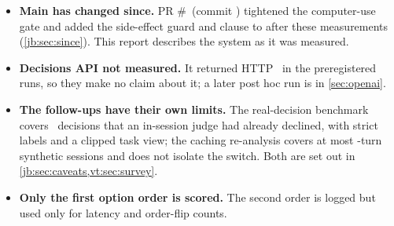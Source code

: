 \begin{itemize}
    from the harness path and are reported as measured.
  \item \textbf{Main has changed since.} PR \#\SincePR\ (commit \code{\SinceCommit}) tightened the
    computer-use gate and added the side-effect guard and clause to  after these
    measurements (\cref{jb:sec:since}). This report describes the system as it was measured.
  \item \textbf{Decisions API not measured.} It returned HTTP \HoldProbeStatus\ in the preregistered runs, so they make no claim about it; a later post hoc run is in \cref{sec:openai}.
  \item \textbf{The follow-ups have their own limits.} The real-decision benchmark covers \TrN\ decisions
    that an in-session judge had already declined, with strict labels and a clipped task view; the caching
    re-analysis covers at most \CaTurns-turn synthetic sessions and does not isolate the switch. Both are
    set out in \cref{jb:sec:caveats,vt:sec:survey}.
  \item \textbf{Only the first option order is scored.} The second order is logged but used only for
    latency and order-flip counts.
\end{itemize}
